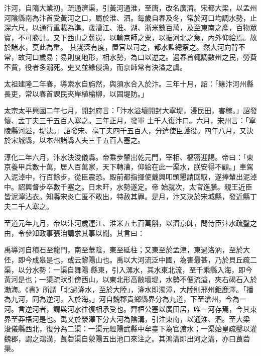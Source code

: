 \begin{pinyinscope}
 汴河，自隋大業初，疏通濟渠，引黃河通淮，至唐，改名廣濟。宋都大梁，以孟州河陰縣南為汴首受黃河之口，屬於淮、泗。每歲自春及冬，常於河口均調水勢，止深六尺，以通行重載為準。歲漕江、淮、湖、浙米數百萬，及至東南之產，百物眾寶，不可勝計。又下西山之薪炭，以輸京師之粟，以振河北之急，內外仰給焉。故於諸水，莫此為重。
 其淺深有度，置官以司之，都水監總察之。然大河向背不常，故河口歲易；易則度地形，相水勢，為口以逆之。遇春首輒調數州之民，勞費不貲，役者多溺死。吏又並緣侵漁，而京師常有決溢之虞。



 太祖建隆二年春，導索水自旃然，與須水合入於汴。三年十月，詔：「緣汴河州縣長吏，常以春首課民夾岸植榆柳，以固堤防。」



 太宗太平興國二年七月，開封府言：「汴水溢壞開封大寧堤，浸民田，害稼。」詔發懷、孟丁夫三千五百人塞之。三年正月，發軍
 士千人復汴口。六月，宋州言：「寧陵縣河溢，堤決。」詔發宋、亳丁夫四千五百人，分遣使臣護役。四年八月，又決於宋城縣，以本州諸縣人夫三千五百人塞之。



 淳化二年六月，汴水決浚儀縣。帝乘步輦出乾元門，宰相、樞密迎謁。帝曰：「東京養甲兵數十萬，居人百萬家，天下轉漕，仰給在此一渠水，朕安得不顧。」車駕入泥淖中，行百餘步，從臣震恐。殿前都指揮使戴興叩頭懇請回馭，遂捧輦出泥淖中。詔興督步卒數千塞之。日未旰，水勢遂定。帝
 始就次，太官進膳。親王近臣皆泥濘沾衣。知縣宋炎亡匿不敢出，特赦其罪。是月，汴又決於宋城縣，發近縣丁夫二千人塞之。



 至道元年九月，帝以汴河歲運江、淮米五七百萬斛，以濟京師，問侍臣汴水疏鑿之由，令參知政事張洎講求其事以聞。其言曰：



 禹導河自積石至龍門，南至華陰，東至砥柱；又東至於孟津，東過洛汭，至於大伾，即今成皋是也，或云黎陽山也。禹以大河流泛中國，為害最甚，乃於貝丘疏二渠，以分水勢：一渠自舞陽
 縣東，引入漯水，其水東北流，至千乘縣入海，即今黃河是也；一渠疏畎引傍西山，以東北形高敝壞堤，水勢不便流溢，夾右碣石入於渤海。《書》所謂「北過洚水，至於大陸」，洚水即濁漳，大陸則邢州鉅鹿澤。「播為九河，同為逆河，入於海。」河自魏郡貴鄉縣界分為九道，下至滄州，今為一河。言逆河者，謂與河水往復相承受也。齊桓公塞以廣田居，唯一河存焉，今其東界至莽梧河是也。禹又於滎澤下分大河為陰溝，引注東南，以通淮、泗。至大梁
 浚儀縣西北，復分為二渠：一渠元經陽武縣中牟臺下為官渡水；一渠始皇疏鑿以灌魏郡，謂之鴻溝，莨菪渠自滎陽五出池口來注之。其鴻溝即出河之溝，亦曰莨菪渠。




\end{pinyinscope}
